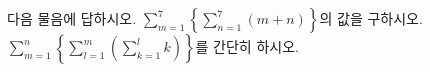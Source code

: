 다음 물음에 답하시오.
 $\displaystyle\sum_{m=1}^{7}\left\{\sum_{n=1}^{7}(m+n)\right\}$의 값을 구하시오.
 $\displaystyle\sum_{m=1}^{n}\left\{\sum_{l=1}^{m}\left(\sum_{k=1}^{l}k\right)\right\}$를 간단히 하시오.
